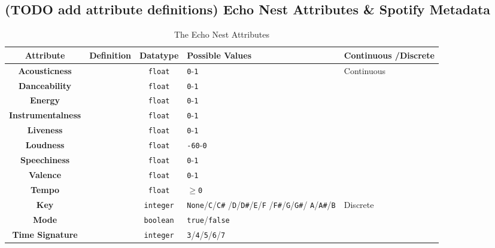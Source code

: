 \subsection{(TODO add attribute definitions) Echo Nest Attributes \& Spotify Metadata}%
\begin{longtable}[c]{|c|c|c|p{5em}|p{5.5em}|}
    \caption{The Echo Nest Attributes}\\%
    \toprule
    \textbf{Attribute} & \textbf{Definition} & \textbf{Datatype} & \textbf{Possible Values} & \textbf{Continuous /Discrete} \\
    \midrule
    \endfirsthead

    \textbf{Acousticness} & & \texttt{float} & \texttt{0}-\texttt{1} & \multirow{9}{*}{Continuous}\\*
    \cmidrule{1-4}
    \textbf{Danceability} & & \texttt{float} & \texttt{0}-\texttt{1} & \\*\cmidrule{1-4}
    \textbf{Energy} & & \texttt{float} & \texttt{0}-\texttt{1} & \\*\cmidrule{1-4}
    \textbf{Instrumentalness} & & \texttt{float} & \texttt{0}-\texttt{1} & \\*\cmidrule{1-4}
    \textbf{Liveness} & & \texttt{float} & \texttt{0}-\texttt{1} & \\*\cmidrule{1-4}
    \textbf{Loudness} & & \texttt{float} & \texttt{-60}-\texttt{0} & \\*\cmidrule{1-4}
    \textbf{Speechiness} & & \texttt{float} & \texttt{0}-\texttt{1} & 
    \\*\cmidrule{1-4}
    \textbf{Valence} & & \texttt{float} & \texttt{0}-\texttt{1} & \\*\cmidrule{1-4}
    \textbf{Tempo} & & \texttt{float} & \(\ge\)\texttt{0} & \\*
    \midrule
    \textbf{Key} & & \texttt{integer} & \texttt{None}/\texttt{C}/\texttt{C\#} /\texttt{D}/\texttt{D\#}/\texttt{E}/\texttt{F} /\texttt{F\#}/\texttt{G}/\texttt{G\#}/ \texttt{A}/\texttt{A\#}/\texttt{B} & \multirow{3}{*}{Discrete}\\*
    \cmidrule{1-4}
    \textbf{Mode} & & \texttt{boolean} & \texttt{true}/\texttt{false} & \\*
    \cmidrule{1-4}
    \textbf{Time Signature} & & \texttt{integer} & \texttt{3}/\texttt{4}/\texttt{5}/\texttt{6}/\texttt{7} & \\*
    \midrule
    
\end{longtable}

